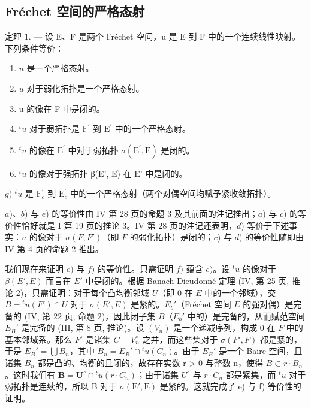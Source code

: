 \subsection{Fréchet 空间的严格态射}

定理 1. --- 设 E、F 是两个 Fréchet 空间，u 是 E 到 F 中的一个连续线性映射。下列条件等价：

\begin{enumerate}
\def\labelenumi{\alph{enumi})}
\item
  \(u\) 是一个严格态射。
\item
  \(u\) 对于弱化拓扑是一个严格态射。
\item
  u 的像在 F 中是闭的。
\item
  \({}^t u\) 对于弱拓扑是 \({\mathrm{F}}^{\prime }\) 到 \({\mathrm{E}}^{\prime }\) 中的一个严格态射。
\item
  \({}^t u\) 的像在 \({\mathrm{E}}^{\prime }\) 中对于弱拓扑 \(\sigma \left( {{\mathrm{E}}^{\prime },\mathrm{E}}\right)\) 是闭的。
\item
  \({}^t u\) 的像对于强拓扑 β(E', E) 在 E' 中是闭的。
\end{enumerate}

\(g)\) \({}^t u\) 是 \(\mathrm{F}_c^\prime\) 到 \(\mathrm{E}_c^\prime\) 中的一个严格态射（两个对偶空间均赋予紧收敛拓扑）。

\(a\))、\(b\)) 与 \(e\)) 的等价性由 IV 第 28 页的命题 3 及其前面的注记推出；\(a\)) 与 \(c\)) 的等价性恰好就是 I 第 19 页的推论 3。IV 第 28 页的注记还表明，\(d\)) 等价于下述事实：\(u\) 的像对于 \(\sigma(F, F')\)（即 \(F\) 的弱化拓扑）是闭的；\(c\)) 与 \(d\)) 的等价性随即由 IV 第 4 页的命题 2 推出。

我们现在来证明 \(e)\) 与 \(f)\) 的等价性。只需证明 \(f)\) 蕴含 \(e)\)。设 \({}^t u\) 的像对于 \(\beta(E', E)\) 而言在 \(E'\) 中是闭的。根据 Banach-Dieudonné 定理 (IV, 第 25 页, 推论 2)，只需证明：对于每个凸均衡邻域 \(U\)（即 \(0\) 在 \(E\) 中的一个邻域），交 \(B = {}^t u(F') \cap U\) 对于 \(\sigma(E', E)\) 是紧的。\(E_b'\)（Fréchet 空间 \(E\) 的强对偶）是完备的 (IV, 第 22 页, 命题 2)，因此闭子集 \(B\)（\(E_b'\) 中的）是完备的，从而赋范空间 \(E_B'\) 是完备的 (III, 第 8 页, 推论)。设 \((V_n)\) 是一个递减序列，构成 \(0\) 在 \(F\) 中的基本邻域系。那么 \(F'\) 是诸集 \(C = V_n^\circ\) 之并，而这些集对于 \(\sigma(F', F)\) 都是紧的，于是 \(E_B' = \bigcup B_n\)，其中 \(B_n = E_B' \cap {}^t u(C_n)\)。由于 \(E_B'\) 是一个 Baire 空间，且诸集 \(B_{n}\) 都是凸的、均衡的且闭的，故存在实数 r \textgreater{} 0 与整数 n，使得 \(B \subset r \cdot B_{n}\)。这时我们有 \(\mathbf{B} = \mathbf{U}^{\circ} \cap {}^{t} u(r \cdot C_{n})\)；由于诸集 \(U^{\circ}\) 与 \(r \cdot C_{n}\) 都是紧集，而 \({}^{t} u\) 对于弱拓扑是连续的，所以 B 对于 \(\sigma(\mathrm{E}', \mathrm{E})\) 是紧的。这就完成了 e) 与 f) 等价性的证明。

